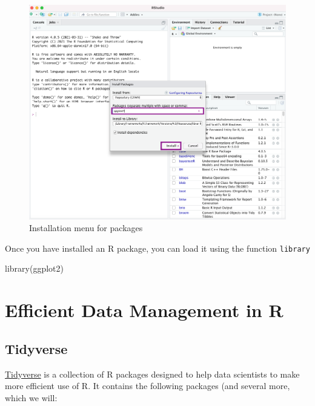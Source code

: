 \documentclass[
]{book}
\newenvironment{Shaded}{\begin{snugshade}}{\end{snugshade}}
\newcommand{\FunctionTok}[1]{\textcolor[rgb]{0.00,0.00,0.00}{#1}}
\newcommand{\NormalTok}[1]{#1}
\begin{document}
\begin{figure}

{\centering \includegraphics[width=0.85\linewidth]{Packages_Installed} 

}

\caption{Installation menu for packages}\label{fig:install2}
\end{figure}

Once you have installed an R package, you can load it using the function \texttt{library}

\begin{Shaded}
\begin{Highlighting}[]
\FunctionTok{library}\NormalTok{(ggplot2)}
\end{Highlighting}
\end{Shaded}

\hypertarget{efficient-data-management-in-r}{%
\chapter{Efficient Data Management in R}\label{efficient-data-management-in-r}}

\hypertarget{tidyverse}{%
\section{Tidyverse}\label{tidyverse}}

\href{https://www.tidyverse.org/}{Tidyverse} is a collection of R packages designed to help data scientists to make more efficient use of R. It contains the following packages (and several more, which we will:
\end{document}
